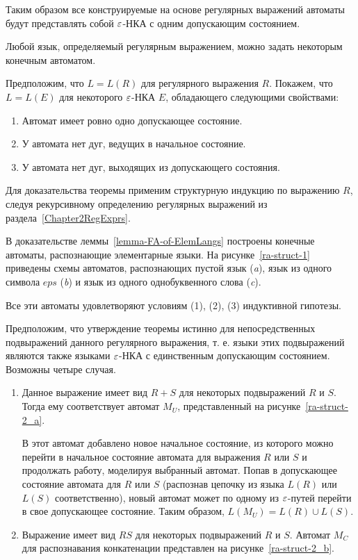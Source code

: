 Таким образом все конструируемые на основе регулярных выражений автоматы будут представлять собой $\varepsilon$-НКА с одним допускающим состоянием.
\begin{mytheorem}
Любой язык, определяемый регулярным выражением, можно задать некоторым конечным автоматом.
\end{mytheorem}
\begin{myproof}
Предположим, что $L = L(R)$ для регулярного выражения $R$. Покажем, что  $L = L(E)$ для некоторого $\varepsilon$-НКА $E$, обладающего следующими свойствами:
\begin{enumerate}
	\item Автомат имеет ровно одно допускающее состояние.
	\item У автомата нет дуг, ведущих в начальное состояние.
	\item У автомата нет дуг, выходящих из допускающего состояния.
\end{enumerate}
Для доказательства теоремы применим структурную индукцию по выражению $R$, следуя рекурсивному определению регулярных выражений из раздела~\ref{Chapter2RegExprs}.

В доказательстве леммы~\ref{lemma-FA-of-ElemLangs} построены конечные автоматы, распознающие элементарные языки. На рисунке~\ref{ra-struct-1} приведены схемы автоматов, распознающих пустой язык (\textsl{a}), язык из одного символа $eps$ (\textsl{b}) и язык из одного однобуквенного слова (\textsl{c}). 



Все эти автоматы удовлетворяют условиям (1), (2), (3) индуктивной гипотезы.

Предположим, что утверждение теоремы истинно для непосредственных подвыражений данного регулярного выражения, т. е. языки этих подвыражений являются также языками $\varepsilon$-НКА с единственным допускающим состоянием. Возможны четыре случая.
\begin{enumerate}
	\item Данное выражение имеет вид $R + S$ для некоторых подвыражений $R$ и $S$. Тогда ему соответствует автомат $M_U$, представленный на рисунке~\ref{ra-struct-2_a}.
	
	

В этот автомат добавлено новое начальное состояние, из которого можно перейти в начальное состояние автомата для выражения $R$ или $S$ и продолжать работу, моделируя выбранный автомат. Попав в допускающее состояние автомата для $R$ или $S$ (распознав цепочку из языка $L(R)$ или $L(S)$ соответственно), новый автомат может по одному из $\varepsilon$-путей перейти в свое допускающее состояние. Таким образом,  $L(M_U) = L(R) \cup L(S)$.
	\item Выражение имеет вид $RS$ для некоторых подвыражений $R$ и $S$. Автомат $M_C$ для распознавания конкатенации представлен на рисунке~\ref{ra-struct-2_b}.
	

\end{enumerate}
\end{myproof}
